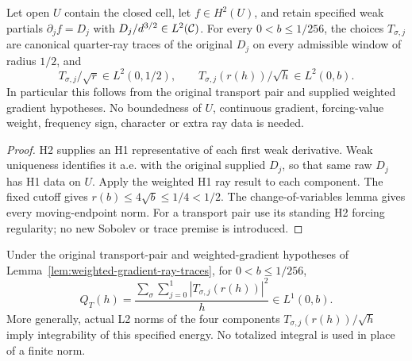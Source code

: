\begin{lemma}
\label{lem:weighted-gradient-ray-traces}
\leanok
Let open $U$ contain the closed cell, let $f\in H^2(U)$, and retain
specified weak partials $\partial_jf=D_j$ with
$D_j/d^{3/2}\in L^2(\mathcal{C})$.
For every $0<b\le1/256$, the choices $T_{\sigma,j}$ are canonical
quarter-ray traces of the original $D_j$ on every admissible window
of radius $1/2$, and
\[
 T_{\sigma,j}/\sqrt r\in L^2(0,1/2),\qquad
 T_{\sigma,j}(r(h))/\sqrt h\in L^2(0,b).
\]
In particular this follows from the original transport pair and supplied
weighted gradient hypotheses. No boundedness of $U$, continuous gradient,
forcing-value weight, frequency sign, character or extra ray data is needed.
\end{lemma}

\begin{proof}
\leanok
H2 supplies an H1 representative of each first weak derivative.
Weak uniqueness identifies it a.e. with the original supplied $D_j$,
so that same raw $D_j$ has H1 data on $U$.
Apply the weighted H1 ray result to each component.
The fixed cutoff gives $r(b)\le4\sqrt b\le1/4<1/2$.
The change-of-variables lemma gives every moving-endpoint norm.
For a transport pair use its standing H2 forcing regularity; no new
Sobolev or trace premise is introduced.
\end{proof}

\begin{lemma}
\label{lem:weighted-gradient-endpoint-energy}
\leanok
Under the original transport-pair and weighted-gradient hypotheses of
Lemma~\ref{lem:weighted-gradient-ray-traces}, for $0<b\le1/256$,
\[
 Q_T(h)=\frac{\sum_\sigma\sum_{j=0}^1|T_{\sigma,j}(r(h))|^2}{h}
 \in L^1(0,b).
\]
More generally, actual L2 norms of the four components
$T_{\sigma,j}(r(h))/\sqrt h$ imply integrability of this specified energy.
No totalized integral is used in place of a finite norm.
\end{lemma}

